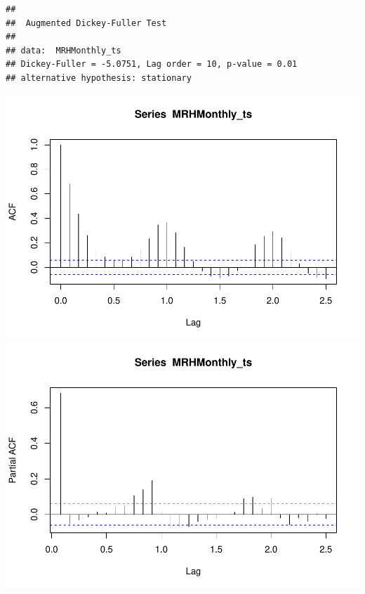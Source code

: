 \documentclass[12pt,]{article}
\begin{document}
\begin{verbatim}
## 
##  Augmented Dickey-Fuller Test
## 
## data:  MRHMonthly_ts
## Dickey-Fuller = -5.0751, Lag order = 10, p-value = 0.01
## alternative hypothesis: stationary
\end{verbatim}

\includegraphics{Project_Template_files/figure-latex/unnamed-chunk-6-14.pdf}
\includegraphics{Project_Template_files/figure-latex/unnamed-chunk-6-15.pdf}
\end{document}
